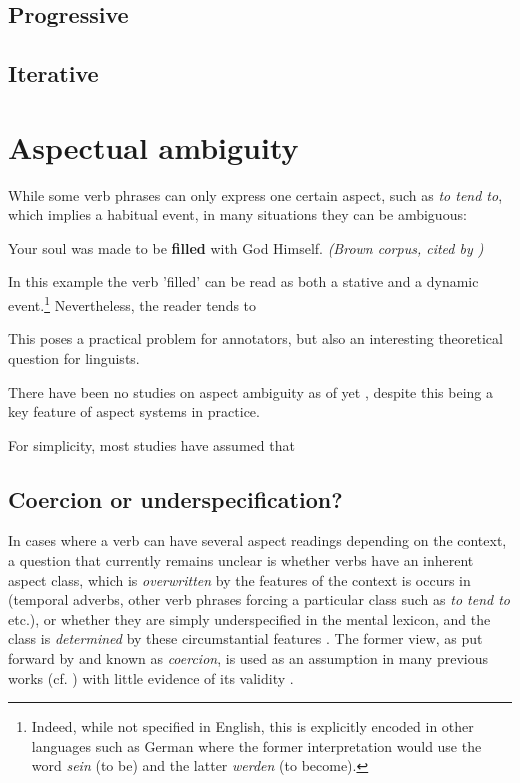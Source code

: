 \subsection*{Progressive}
\subsection*{Iterative}

\section{Aspectual ambiguity}
While some verb phrases can only express one certain aspect, such as \emph{to tend to}, which implies a habitual event, in many situations they can be ambiguous:
\begin{exe}
    \ex Your soul was made to be \textbf{filled} with God Himself. \emph{(Brown corpus, cited by \citet{Friedrich2014AutomaticPO})}
\end{exe}
In this example the verb 'filled' can be read as both a stative and a dynamic event.\footnote{Indeed, while not specified in English, this is explicitly encoded in other languages such as German where the former interpretation would use the word \emph{sein} (to be) and the latter \emph{werden} (to become).} Nevertheless, the reader tends to 

This poses a practical problem for annotators, but also an interesting theoretical question for linguists. 

There have been no studies on aspect ambiguity as of yet \citep{friedrich-etal-2023-kind}, despite this being a key feature of aspect systems in practice. 

For simplicity, most studies have assumed that 

\subsection{Coercion or underspecification?}
In cases where a verb can have several aspect readings depending on the context, a question that currently remains unclear is whether verbs have an inherent aspect class, which is \emph{overwritten} by the features of the context is occurs in (temporal adverbs, other verb phrases forcing a particular class such as \emph{to tend to} etc.), or whether they are simply underspecified in the mental lexicon, and the class is \emph{determined} by these circumstantial features \citep{https://doi.org/10.11588/huplc.2017.0.37820}. The former view, as put forward by \citet{moens-steedman-1988-temporal} and known as \emph{coercion}, is used as an assumption in many previous works (cf. \citet{Swart+2019+321+349}) with little evidence of its validity \citep{https://doi.org/10.11588/huplc.2017.0.37820}.

